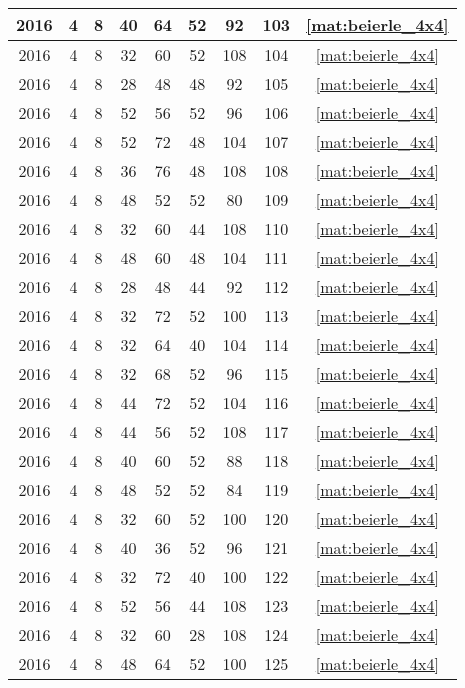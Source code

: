 \begin{longtable}{|c|c|c|c|c|c|c|c|c|}
2016 & 4 & 8 & 40 & 64 & 52 & 92 & 103 & \eqref{mat:beierle_4x4} \\ \hline 
2016 & 4 & 8 & 32 & 60 & 52 & 108 & 104 & \eqref{mat:beierle_4x4} \\ \hline 
2016 & 4 & 8 & 28 & 48 & 48 & 92 & 105 & \eqref{mat:beierle_4x4} \\ \hline 
2016 & 4 & 8 & 52 & 56 & 52 & 96 & 106 & \eqref{mat:beierle_4x4} \\ \hline 
2016 & 4 & 8 & 52 & 72 & 48 & 104 & 107 & \eqref{mat:beierle_4x4} \\ \hline 
2016 & 4 & 8 & 36 & 76 & 48 & 108 & 108 & \eqref{mat:beierle_4x4} \\ \hline 
2016 & 4 & 8 & 48 & 52 & 52 & 80 & 109 & \eqref{mat:beierle_4x4} \\ \hline 
2016 & 4 & 8 & 32 & 60 & 44 & 108 & 110 & \eqref{mat:beierle_4x4} \\ \hline 
2016 & 4 & 8 & 48 & 60 & 48 & 104 & 111 & \eqref{mat:beierle_4x4} \\ \hline 
2016 & 4 & 8 & 28 & 48 & 44 & 92 & 112 & \eqref{mat:beierle_4x4} \\ \hline 
2016 & 4 & 8 & 32 & 72 & 52 & 100 & 113 & \eqref{mat:beierle_4x4} \\ \hline 
2016 & 4 & 8 & 32 & 64 & 40 & 104 & 114 & \eqref{mat:beierle_4x4} \\ \hline 
2016 & 4 & 8 & 32 & 68 & 52 & 96 & 115 & \eqref{mat:beierle_4x4} \\ \hline 
2016 & 4 & 8 & 44 & 72 & 52 & 104 & 116 & \eqref{mat:beierle_4x4} \\ \hline 
2016 & 4 & 8 & 44 & 56 & 52 & 108 & 117 & \eqref{mat:beierle_4x4} \\ \hline 
2016 & 4 & 8 & 40 & 60 & 52 & 88 & 118 & \eqref{mat:beierle_4x4} \\ \hline 
2016 & 4 & 8 & 48 & 52 & 52 & 84 & 119 & \eqref{mat:beierle_4x4} \\ \hline 
2016 & 4 & 8 & 32 & 60 & 52 & 100 & 120 & \eqref{mat:beierle_4x4} \\ \hline 
2016 & 4 & 8 & 40 & 36 & 52 & 96 & 121 & \eqref{mat:beierle_4x4} \\ \hline 
2016 & 4 & 8 & 32 & 72 & 40 & 100 & 122 & \eqref{mat:beierle_4x4} \\ \hline 
2016 & 4 & 8 & 52 & 56 & 44 & 108 & 123 & \eqref{mat:beierle_4x4} \\ \hline 
2016 & 4 & 8 & 32 & 60 & 28 & 108 & 124 & \eqref{mat:beierle_4x4} \\ \hline 
2016 & 4 & 8 & 48 & 64 & 52 & 100 & 125 & \eqref{mat:beierle_4x4} \\ \hline 

\end{longtable}
